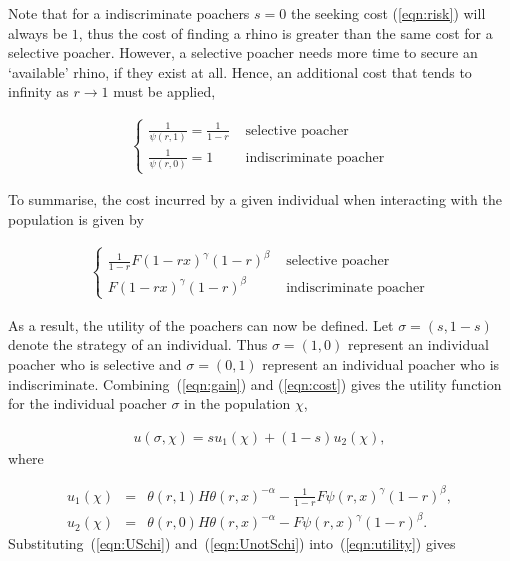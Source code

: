 \documentclass[10pt]{article}
\begin{document}
Note that for a indiscriminate poachers \(s = 0\) the seeking 
cost (\ref{eqn:risk}) will always be \(1\), thus the cost of finding a rhino is greater
than the same cost for a selective poacher. However, a selective poacher needs 
more time to secure an `available' rhino, if they exist at all. Hence, an 
additional cost that tends to infinity as \(r \rightarrow 1\) must be applied, 

\begin{eqnarray}
	\label{eqn:selective_cost}
	\left\{
	\begin{array}{cl}
	\frac{1}{\psi(r, 1)} = \frac{1}{1 - r} & \mbox{ selective poacher}
	\\
	\frac{1}{\psi(r, 0)} = 1 & \mbox{ indiscriminate poacher}
	\end{array} \right.
\end{eqnarray}

To summarise, the cost incurred by a given individual when interacting with
the population is given by 

\begin{eqnarray}
	\label{eqn:cost}
	\left\{
	\begin{array}{cl}
	\frac{1}{1 - r}  F(1- rx)^{\gamma} (1-r)^{\beta}& \mbox{ selective poacher}
	\\
	F(1 - rx)^{\gamma} (1-r)^{\beta}& \mbox{ indiscriminate poacher}
	\end{array} \right.
\end{eqnarray}

As a result, the utility of the poachers can now be defined. Let \(\sigma = (s, 1 - s)\)
denote the strategy of an individual. Thus \(\sigma = (1, 0)\) represent an
individual poacher who is selective and \(\sigma = (0, 1)\) represent an individual
poacher who is indiscriminate. Combining~(\ref{eqn:gain}) and (\ref{eqn:cost})
gives the utility function for the individual poacher \(\sigma\) in the population
\(\chi\),

\begin{eqnarray}
\label{eqn:utility}
u(\sigma, \chi) = s u_1(\chi) +(1 - s) u_2(\chi),
\end{eqnarray}
where

\begin{eqnarray}
\label{eqn:USchi}
u_1(\chi) &=& \theta(r,1) H \theta(r,x)^{-\alpha}
- \frac{1}{1- r} F\psi(r, x)^{\gamma} (1-r)^{\beta} ,
\\
\label{eqn:UnotSchi}
u_2(\chi) &=& \theta(r,0) H \theta(r,x)^{-\alpha}
- F\psi(r, x)^{\gamma}  (1-r)^{\beta}.
\end{eqnarray}
Substituting~(\ref{eqn:USchi}) and~(\ref{eqn:UnotSchi}) into~(\ref{eqn:utility}) gives
\end{document}
